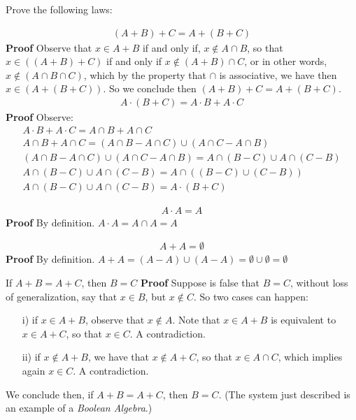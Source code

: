 \documentclass[11pt,a4paper]{article}
\begin{document}
Prove the following laws: \par 
\begin{align*}
(A + B) + C = A + (B + C)
\end{align*}
\textbf{Proof} Observe that  $ x \in A + B$ if and only if, $ x \not\in A \cap B $, so that $ x \in ((A+B) + C) $ if and only if $ x \not\in (A+B) \cap C$, or in other words, $ x \not\in (A \cap B \cap C)$, which by the property that $\cap$ is associative, we have then $ x \in (A + (B+C)) $. So we conclude then $ (A + B) + C = A + (B + C) $.
\begin{align*}
A \cdot (B + C) = A \cdot B + A \cdot C
\end{align*}
\textbf{Proof} Observe:
\begin{align*}
	 A \cdot B + A \cdot C = A \cap B + A \cap C \\
	 A \cap B + A \cap C = (A \cap B - A \cap C) \cup (A \cap C - A \cap B) \\
	 (A \cap B - A \cap C) \cup (A \cap C - A \cap B)  = A \cap (B-C) \cup A \cap (C-B) \\
	 A \cap (B-C) \cup A \cap (C-B) = A \cap ((B-C) \cup (C-B)) \\
	 A \cap (B-C) \cup A \cap (C-B) = A \cdot (B+C)
\end{align*} 
\par
\begin{align*}
A \cdot A = A
\end{align*}
\textbf{Proof}
By definition. $A \cdot A = A \cap A = A $
\par
\begin{align*}
A + A = \emptyset
\end{align*}
\textbf{Proof}
By definition. $A+A = (A - A) \cup (A - A) = \emptyset \cup \emptyset = \emptyset$
\par 
If $ A + B = A + C$, then $ B = C$
\textbf{Proof}
Suppose is false that $B = C $, without loss of generalization, say that  $x \in B$, but $ x \not\in C$. So two cases can happen:
\begin{itemize}
	\item[i)] if $x \in A + B$, observe that $ x \not\in A$. Note that $x \in A + B $ is equivalent to $ x \in A + C$, so that $ x \in C$. A contradiction.
	\item[ii)] if $x \not\in A + B$, we have that $x \not\in A + C$, so that $ x \in A \cap C$, which implies again $ x \in C$. A contradiction.
\end{itemize}
We conclude then, if $ A + B = A + C$, then $ B = C$.
(The system just described is an example of a\textit{ Boolean Algebra}.)
\end{document}
